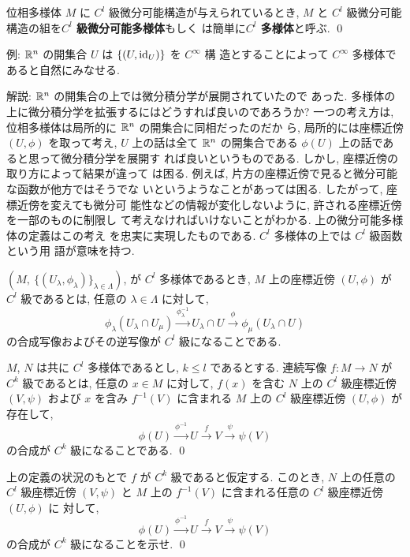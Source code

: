 \documentclass[12pt,twoside]{jarticle}
\def\id{\text{\rm id}}
\def\R{{\Bbb R}} %
\begin{document}
\begin{Definition}
  位相多様体 $M$ に $C^l$ 級微分可能構造が与えられているとき, %
  $M$ と $C^l$ 級微分可能構造の組を{\bf $C^l$ 級微分可能多様体}もしく
  は簡単に{\bf $C^l$ 多様体}と呼ぶ. \qed
\end{Definition}

\noindent 例: $\R^n$ の開集合 $U$ は $\{(U, \id_U)\}$ を $C^\infty$ 構
造とすることによって $C^\infty$ 多様体であると自然にみなせる.

\medskip

\noindent 解説: $\R^n$ の開集合の上では微分積分学が展開されていたので
あった. 多様体の上に微分積分学を拡張するにはどうすれば良いのであろうか? 
一つの考え方は, 位相多様体は局所的に $\R^n$ の開集合に同相だったのだか
ら, 局所的には座標近傍 $(U, \phi)$ を取って考え, $U$ 上の話は全て %
$\R^n$ の開集合である $\phi(U)$ 上の話であると思って微分積分学を展開す
れば良いというものである. しかし, 座標近傍の取り方によって結果が違って
は困る. 例えば, 片方の座標近傍で見ると微分可能な函数が他方ではそうでな
いというようなことがあっては困る. したがって, 座標近傍を変えても微分可
能性などの情報が変化しないように, 許される座標近傍を一部のものに制限し
て考えなければいけないことがわかる. 上の微分可能多様体の定義はこの考え
を忠実に実現したものである. $C^l$ 多様体の上では $C^l$ 級函数という用
語が意味を持つ.

\medskip

$(M,\ \{(U_\lambda,\phi_\lambda)\}_{\lambda\in\Lambda})$, %
が $C^l$ 多様体であるとき, $M$ 上の座標近傍 $(U,\phi)$ が %
$C^l$ 級であるとは,%
任意の $\lambda\in\Lambda$ に対して,
\[
  \phi_\lambda(U_\lambda\cap U_\mu)
  \overset{\phi_\lambda^{-1}}\longrightarrow
  U_\lambda\cap U
  \overset{\phi}\longrightarrow
  \phi_\mu(U_\lambda\cap U)
\]%
の合成写像およびその逆写像が $C^l$ 級になることである.

\begin{Definition}
  $M$, $N$ は共に $C^l$ 多様体であるとし, $k \le l$ であるとする. %
  連続写像 $f \colon M \to N$ が$C^k$ 級であるとは, %
  任意の $x\in M$ に対して, %
  $f(x)$ を含む $N$ 上の $C^l$ 級座標近傍 $(V, \psi)$ および %
  $x$ を含み $f^{-1}(V)$ に含まれる $M$ 上の %
  $C^l$ 級座標近傍 $(U, \phi)$ が存在して,
  \[
    \phi(U)
    \overset{\phi^{-1}}\longrightarrow
    U
    \overset{f}\longrightarrow
    V
    \overset{\psi}\longrightarrow
    \psi(V)
  \]
  の合成が $C^k$ 級になることである. \qed
\end{Definition}

\begin{question}
  上の定義の状況のもとで $f$ が $C^k$ 級であると仮定する. このとき, %
  $N$ 上の任意の $C^l$ 級座標近傍 $(V,\psi)$ と %
  $M$ 上の $f^{-1}(V)$ に含まれる任意の $C^l$ 級座標近傍 $(U,\phi)$ に
  対して,
  \[
    \phi(U)
    \overset{\phi^{-1}}\longrightarrow
    U
    \overset{f}\longrightarrow
    V
    \overset{\psi}\longrightarrow
    \psi(V)
  \]
  の合成が $C^k$ 級になることを示せ. \qed
\end{question}
\end{document}
